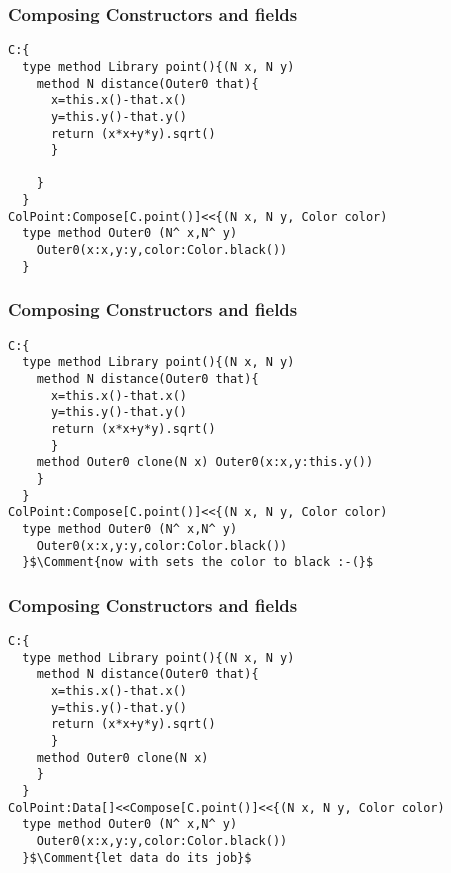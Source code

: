\begin{frame}[fragile]
\frametitle{Composing Constructors and fields}


\begin{NiceCode}{59ex}{0.9}
\begin{lstlisting}
C:{
  type method Library point(){(N x, N y)
    method N distance(Outer0 that){
      x=this.x()-that.x()
      y=this.y()-that.y()
      return (x*x+y*y).sqrt()
      }

    }
  }
ColPoint:Compose[C.point()]<<{(N x, N y, Color color)
  type method Outer0 (N^ x,N^ y)
    Outer0(x:x,y:y,color:Color.black())
  }
\end{lstlisting}
\end{NiceCode}
\end{frame}

\begin{frame}[fragile]
\frametitle{Composing Constructors and fields}
\addtocounter{framenumber}{-1}

\begin{NiceCode}{59ex}{0.9}
\begin{lstlisting}
C:{
  type method Library point(){(N x, N y)
    method N distance(Outer0 that){
      x=this.x()-that.x()
      y=this.y()-that.y()
      return (x*x+y*y).sqrt()
      }
    method Outer0 clone(N x) Outer0(x:x,y:this.y())
    }
  }
ColPoint:Compose[C.point()]<<{(N x, N y, Color color)
  type method Outer0 (N^ x,N^ y)
    Outer0(x:x,y:y,color:Color.black())
  }$\Comment{now with sets the color to black :-(}$
\end{lstlisting}
\end{NiceCode}
\end{frame}

\begin{frame}[fragile]
\frametitle{Composing Constructors and fields}
\addtocounter{framenumber}{-1}

\begin{NiceCode}{59ex}{0.9}
\begin{lstlisting}
C:{
  type method Library point(){(N x, N y)
    method N distance(Outer0 that){
      x=this.x()-that.x()
      y=this.y()-that.y()
      return (x*x+y*y).sqrt()
      }
    method Outer0 clone(N x)
    }
  }
ColPoint:Data[]<<Compose[C.point()]<<{(N x, N y, Color color)
  type method Outer0 (N^ x,N^ y)
    Outer0(x:x,y:y,color:Color.black())
  }$\Comment{let data do its job}$
\end{lstlisting}
\end{NiceCode}
\end{frame}


